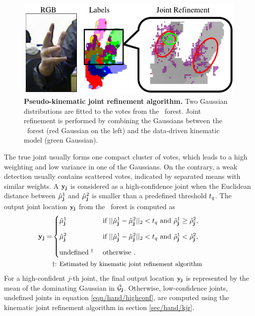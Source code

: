 \begin{figure}[ht]
	\centering
	\includegraphics[width=0.8\linewidth]{fig/hand/fig3.pdf}
	\caption{\textbf{Pseudo-kinematic joint refinement algorithm.} Two Gaussian distributions are fitted to the votes from the \STR\ forest. Joint refinement is performed by combining the Gaussians between the \STR\ forest (red Gaussian on the left) and the data-driven kinematic model (green Gaussian).}
	\label{fig/hand/refine}
\end{figure}

The true joint usually forms one compact cluster of votes, which leads to a high weighting and low variance in one of the Gaussians. 
On the contrary, a weak detection usually contains scattered votes, indicated by separated means with similar weights. 
A $\mathbf{y}_{\mathbf{j}}$ is considered as a high-confidence joint when the Euclidean distance between $\hat{\mu}_{\mathbf{j}}^{1}$ and $\hat{\mu}_{\mathbf{j}}^{2}$ is smaller than a predefined threshold $t_{q}$. The output joint location $\mathbf{y}_{\mathbf{j}}$ from the \STR\ forest is computed as
\begin{equation}
	\begin{aligned}
	\testonejoint_{\joint} = &  
	\begin{cases}
		\hat{\mu}_{\joint}^{1} & \mbox{ if } ||\hat{\mu}_{\joint}^{1} - \hat{\mu}_{\joint}^{2}||_2 < \testqualthres \mbox{ and } \hat{\rho}_{\joint}^{1} \ge \hat{\rho}_{\joint}^{2}, \\[3mm] 
		\hat{\mu}_{\joint}^{2} & \mbox{ if } ||\hat{\mu}_{\joint}^{1} - \hat{\mu}_{\joint}^{2}||_2 < \testqualthres \mbox{ and } \hat{\rho}_{\joint}^{1} < \hat{\rho}_{\joint}^{2}, \\[3mm] 
		\mbox{undefined$\;^{\dagger}$} & \mbox{ otherwise }. 
	\end{cases}\\
	& \parbox{0.7\linewidth}{\small $\dagger$: Estimated by kinematic joint refinement algorithm}
	\end{aligned}
	\label{eqn/hand/highconf}
\end{equation}
For a high-confident $j$-th joint, the final output location $\mathbf{y}_{\mathbf{j}}$ is represented by the mean of the dominating Gaussian in $\hat{\mathcal{G}}_{\mathbf{j}}$. Otherwise, low-confidence joints, \ie undefined joints in equation \ref{eqn/hand/highconf}, are computed using the kinematic joint refinement algorithm in section \ref{sec/hand/kjr}. 

